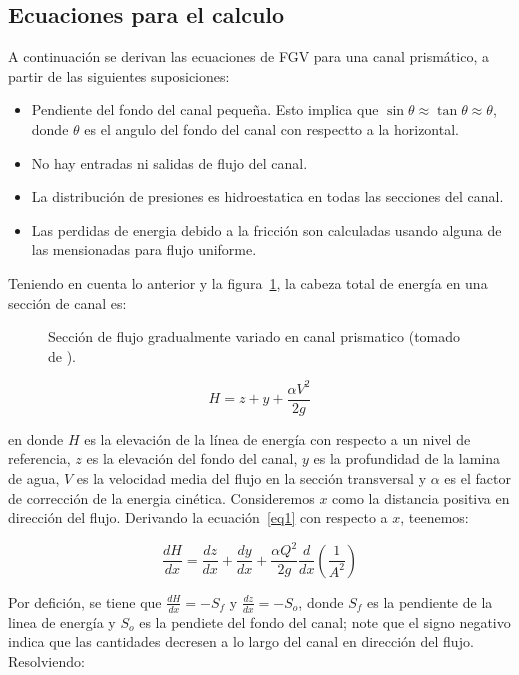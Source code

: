 \documentclass[11pt, oneside]{article}
\begin{document}
\subsection{Ecuaciones para el calculo} 
A continuaci\'on se derivan las ecuaciones de FGV para una canal prism\'atico, a partir de las siguientes suposiciones:
\begin{itemize}
    \item Pendiente del fondo del canal pequeña. Esto implica que $\sin \theta \approx \tan \theta \approx \theta$, donde $\theta$ es el angulo del fondo del canal con respectto a la horizontal. 
    \item No hay entradas ni salidas de flujo del canal.
    \item La distribuci\'on de presiones es hidroestatica en todas las secciones del canal.
    \item Las perdidas de energia debido a la fricci\'on son calculadas usando alguna de las mensionadas para flujo uniforme.
\end{itemize}
Teniendo en cuenta lo anterior y la figura~\ref{fig1}, la cabeza total de energ\'ia en una secci\'on de canal es:
\begin{figure}[h]
\centering
\caption{Secci\'on de flujo gradualmente variado en canal prismatico (tomado de \cite{Chau}).}
\label{fig1}
\end{figure}

\begin{equation}
    H = z + y + \frac{\alpha V^2}{2g}
\label{eq1}
\end{equation}

en donde $H$ es la elevaci\'on de la l\'inea de energ\'ia con respecto a un nivel de referencia, $z$ es la elevaci\'on del fondo del canal, $y$ es la profundidad de la lamina de agua, $V$ es la velocidad media del flujo en  la secci\'on transversal y $\alpha$ es el factor de correcci\'on de la energia cin\'etica. Consideremos $x$ como la distancia  positiva en direcci\'on del flujo. Derivando la ecuaci\'on~\ref{eq1} con respecto a $x$, teenemos:

\begin{equation}
    \frac{dH}{dx} = \frac{dz}{dx} + \frac{dy}{dx} + \frac{\alpha Q^2}{2g} \frac{d}{dx}\left( \frac{1}{A^2}\right)
\label{eq2}
\end{equation}

Por defici\'on, se tiene que $\frac{dH}{dx} = -S_f $ y $\frac{dz}{dx} = -S_o $, donde $S_f$ es la pendiente de la linea de energ\'ia y $S_o$ es la pendiete del fondo del canal; note que el signo negativo indica que las cantidades decresen a lo largo del canal en direcci\'on del flujo.
Resolviendo:
\end{document}
